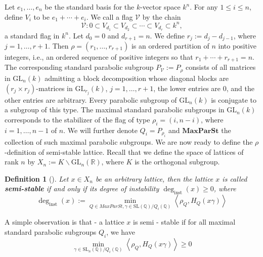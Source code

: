 \documentclass[12pt]{article} %
\newtheorem{definition}{Definition}[section]
\begin{document}
Let \( e_1, \ldots, e_n \) be the standard basis for the \( k \)-vector space \( k^n \). For any \( 1 \leq i \leq n \), define \( V_i \) to be \( e_1 + \cdots + e_i \). We call a flag \( \mathcal{V} \) by the chain
\[
    \mathcal{V}: 0 \subset V_{d_1} \subset V_{d_2} \subset \cdots \subset V_{d_r} \subset k^n,
\]
a standard flag in \( k^n \). Let \( d_0 = 0 \) and \( d_{r+1} = n \). We define \( r_j := d_j - d_{j-1} \), where \( j = 1, \ldots, r+1 \). Then \( \rho = (r_1, \ldots, r_{r+1}) \) is an ordered partition of \( n \) into positive integers, i.e., an ordered sequence of positive integers so that \( r_1 + \cdots + r_{r+1} = n \). The corresponding standard parabolic subgroup \( P_{\mathcal{V}} := P_{\rho} \) consists of all matrices in \( \text{GL}_n(k) \) admitting a block decomposition whose diagonal blocks are \( (r_j \times r_j) \)-matrices in \( \text{GL}_{r_j}(k) \), \( j = 1, \ldots, r+1 \), the lower entries are 0, and the other entries are arbitrary. Every parabolic subgroup of \( \text{GL}_n(k) \) is conjugate to a subgroup of this type.
The maximal standard parabolic subgroups in $\text{GL}_n(k)$ corresponds to the
stabilizer of the flag of type $\rho_i =(i,n-i)$, where $i = 1,\ldots,n-1$ of $n$. We will
further denote $Q_i = P_{\rho_i}$ and $\textbf{MaxParSt}$ the collection of such maximal parabolic subgroups.
We are now ready to define the $\rho$-definition of semi-stable lattice. Recall that
we define the space of lattices of rank $n$ by $X_n := K \backslash \text{GL}_n(\mathbb{R})$, where $K$ is the orthogonal subgroup.
\begin{definition}[\label  = $\rho$-definition]\label{ss2}
    Let $x \in X_n$ be an arbitrary lattice, then the lattice $x$ is called \textbf{semi-stable} if and only if its degree of instability $\deg_{\text{inst}}(x)\ge 0$, where
    \[\deg_{\text{inst}}(x):= \min_{Q \in MaxParSt, \gamma \in \text{SL}(\mathbb{Q})/Q_i(\mathbb{Q})}\left\langle \rho_Q, H_Q(x\gamma) \right\rangle\]
\end{definition}
A simple observation is that - a lattice $x$ is semi - stable if for all maximal standard parabolic subgroups
$Q_i$, we have
\[\min_{\gamma \in \text{SL}_n(\mathbb{Q})/Q_i(\mathbb{Q})}\left\langle \rho_Q, H_Q(x\gamma) \right\rangle \ge 0\]
\end{document}
